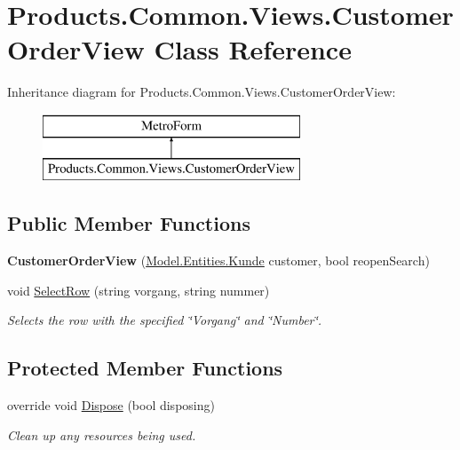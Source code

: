 \hypertarget{class_products_1_1_common_1_1_views_1_1_customer_order_view}{}\section{Products.\+Common.\+Views.\+Customer\+Order\+View Class Reference}
\label{class_products_1_1_common_1_1_views_1_1_customer_order_view}
Inheritance diagram for Products.\+Common.\+Views.\+Customer\+Order\+View\+:\begin{figure}[H]
\begin{center}
\leavevmode
\includegraphics[height=2.000000cm]{class_products_1_1_common_1_1_views_1_1_customer_order_view}
\end{center}
\end{figure}
\subsection*{Public Member Functions}
\begin{DoxyCompactItemize}
\item 
{\bfseries Customer\+Order\+View} (\hyperlink{class_products_1_1_model_1_1_entities_1_1_kunde}{Model.\+Entities.\+Kunde} customer, bool reopen\+Search)\hypertarget{class_products_1_1_common_1_1_views_1_1_customer_order_view_a3c9e3eaf63fd6566ee1152846d9b2fae}{}\label{class_products_1_1_common_1_1_views_1_1_customer_order_view_a3c9e3eaf63fd6566ee1152846d9b2fae}

\item 
void \hyperlink{class_products_1_1_common_1_1_views_1_1_customer_order_view_a420fa1ef0f0cdc87c46eccf07172f5ad}{Select\+Row} (string vorgang, string nummer)
\begin{DoxyCompactList}\small\item\em Selects the row with the specified \char`\"{}\+Vorgang\char`\"{} and \char`\"{}\+Number\char`\"{}. \end{DoxyCompactList}\end{DoxyCompactItemize}
\subsection*{Protected Member Functions}
\begin{DoxyCompactItemize}
\item 
override void \hyperlink{class_products_1_1_common_1_1_views_1_1_customer_order_view_a45ed1a44d25c299f8f2877f2eb673071}{Dispose} (bool disposing)
\begin{DoxyCompactList}\small\item\em Clean up any resources being used. \end{DoxyCompactList}\end{DoxyCompactItemize}
